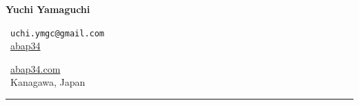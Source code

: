 \setlength{\parskip}{0.3em}

\pagestyle{empty}



{\Huge\bfseries Yuchi Yamaguchi}

\noindent
\begin{minipage}[t]{0.48\linewidth}
  \raggedright
  {\FA\faEnvelope\ }\texttt{uchi.ymgc@gmail.com} \\[0.3em]
  {\FA\faGithub\ }\href{https://github.com/abap34}{abap34}
\end{minipage}%
\hfill
\begin{minipage}[t]{0.48\linewidth}
  \raggedright
  {\FA\faLink\ }\href{https://abap34.com}{abap34.com} \\[0.3em]
  {\FA\faMapMarker\ }Kanagawa, Japan
\end{minipage}



{\color{rule}\rule{\linewidth}{0.15pt}}



